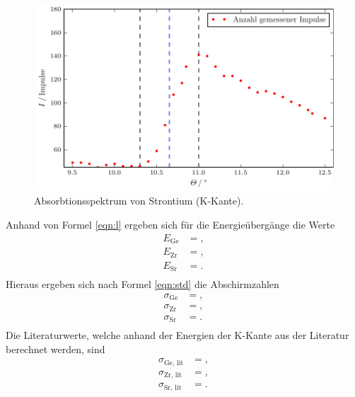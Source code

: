 \begin{figure}
  \centering
  \includegraphics{build/plot_sr.pdf}
  \caption{Absorbtionsspektrum von Strontium (K-Kante).}
  \label{fig:plot6}
\end{figure}

Anhand von Formel \eqref{eqn:l} ergeben sich für die Energieübergänge die Werte
\begin{align*}
  E_\text{Ge} &= , \\
  E_\text{Zr} &= , \\
  E_\text{Sr} &= . \\
\end{align*}
Hieraus ergeben sich nach Formel \eqref{eqn:std} die Abschirmzahlen
\begin{align*}
  \sigma_\text{Ge} &= , \\
  \sigma_\text{Zr} &= , \\
  \sigma_\text{Sr} &= . \\
\end{align*}
Die Literaturwerte, welche anhand der Energien der K-Kante aus der Literatur \cite{energie} berechnet werden, sind
\begin{align*}
  \sigma_\text{Ge, lit} &= , \\
  \sigma_\text{Zr, lit} &= , \\
  \sigma_\text{Sr, lit} &= . \\
\end{align*}

